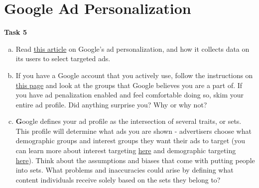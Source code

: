 \documentclass[12pt,letterpaper]{article}
\newif\ifsol
\newcommand{\solu}[2]{ \begin{mdframed} \ifsol #2 \else \vspace{#1} \fi \end{mdframed} }
\begin{document}
\section*{Google Ad Personalization}
\textbf{Task 5}
 \begin{enumerate}[a.]
    \item Read \href{https://www.practicalecommerce.com/how-google-collects-data-to-personalize-ads}{this article} on Google's ad personalization, and how it collects data on its users to select targeted ads. 
    
    \item If you have a Google account that you actively use, follow the instructions on \href{https://www.businessinsider.com/what-does-google-know-about-me-search-history-delete-2019-10#first-navigate-to-your-google-account-homepage-by-clicking-the-widget-in-the-top-right-corner-of-any-google-site-1}{this page} and look at the groups that Google believes you are a part of. If you have ad penalization enabled and feel comfortable doing so, skim your entire ad profile. Did anything surprise you? Why or why not?
    
    \solu{}{
     \textit{Pass condition:} Students should be able to identify (if they opted to look at their profile, which is optional) certain groups or trends Google believes they are a part of. Any sort of reaction is fine, as it is impossible to predict how many groups google has put them.
     }
    
    \item 
    \textbf Google defines your ad profile as the intersection of several traits, or sets. This profile will determine what ads you are shown - advertisers choose what demographic groups and interest groups they want their ads to target (you can learn more about interest targeting \href{https://support.google.com/google-ads/answer/2497941}{here} and demographic targeting \href{https://support.google.com/google-ads/answer/2580383}{here}). Think about the assumptions and biases that come with putting people into sets. What problems and inaccuracies could arise by defining what content individuals receive solely based on the sets they belong to?
    
    \solu{}{
     \textit{Pass condition:} Students should be able to identify at least one disadvantage with defining people's content consumption by wide sets, such as stereotyping, inaccuracy, or confirmation bias. They should be able to understand that not every member of a set is the same, but designing programs around what a set "believes" runs the risk of treating every element in that set as interchangeable.
     
}
\end{enumerate}
\end{document}
